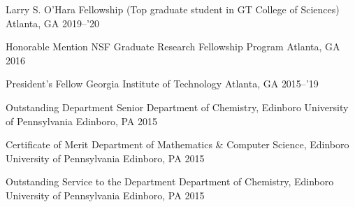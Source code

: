 



\begin{cvhonors}


  \cvhonor
    {Larry S. O'Hara Fellowship} %
    {(Top graduate student in GT College of Sciences)} %
    {Atlanta, GA} %
    {2019--'20} %


  \cvhonor
    {Honorable Mention} %
    {NSF Graduate Research Fellowship Program} %
    {Atlanta, GA} %
    {2016} %


  \cvhonor
    {President's Fellow} %
    {Georgia Institute of Technology} %
    {Atlanta, GA} %
    {2015--'19} %


  \cvhonor
    {Outstanding Department Senior} %
    {Department of Chemistry, Edinboro University of Pennsylvania} %
    {Edinboro, PA} %
    {2015} %


  \cvhonor
    {Certificate of Merit} %
    {Department of Mathematics \& Computer Science, Edinboro University of Pennsylvania} %
    {Edinboro, PA} %
    {2015} %


  \cvhonor
    {Outstanding Service to the Department} %
    {Department of Chemistry, Edinboro University of Pennsylvania} %
    {Edinboro, PA} %
    {2015} %


\end{cvhonors}
